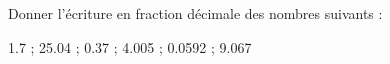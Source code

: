 \begin{exercice}
    Donner l'écriture en fraction décimale des nombres suivants :
    \begin{center}
       \num{1.7} \; ; \; \num{25.04} \; ; \; \num{0.37} \; ; \; \num{4.005} \; ; \; \num{0.0592} \; ; \; \num{9.067}
    \end{center}
 \end{exercice}

